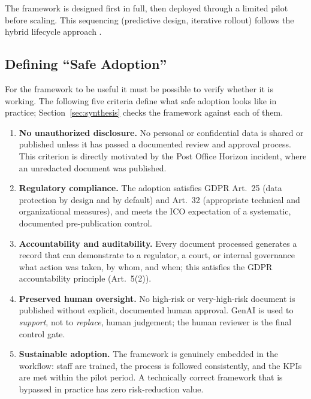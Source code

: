 \documentclass[12pt,a4paper]{article}
\begin{document}
The framework is designed first in full, then deployed through a limited pilot before scaling. This sequencing (predictive design, iterative rollout) follows the hybrid lifecycle approach \cite{falchi_slides}.

\subsection{Defining ``Safe Adoption''}
\label{sec:safe_adoption}

For the framework to be useful it must be possible to verify whether it is working. The following five criteria define what safe adoption looks like in practice; Section~\ref{sec:synthesis} checks the framework against each of them.

\begin{definitionbox}
\begin{enumerate}
  \item \textbf{No unauthorized disclosure.} No personal or confidential data is shared or published unless it has passed a documented review and approval process. This criterion is directly motivated by the Post Office Horizon incident, where an unredacted document was published.

  \item \textbf{Regulatory compliance.} The adoption satisfies GDPR Art.~25 (data protection by design and by default) and Art.~32 (appropriate technical and organizational measures), and meets the ICO expectation of a systematic, documented pre-publication control.

  \item \textbf{Accountability and auditability.} Every document processed generates a record that can demonstrate to a regulator, a court, or internal governance what action was taken, by whom, and when; this satisfies the GDPR accountability principle (Art.~5(2)).

  \item \textbf{Preserved human oversight.} No high-risk or very-high-risk document is published without explicit, documented human approval. GenAI is used to \emph{support}, not to \emph{replace}, human judgement; the human reviewer is the final control gate.

  \item \textbf{Sustainable adoption.} The framework is genuinely embedded in the workflow: staff are trained, the process is followed consistently, and the KPIs are met within the pilot period. A technically correct framework that is bypassed in practice has zero risk-reduction value.
\end{enumerate}
\end{definitionbox}
\end{document}
